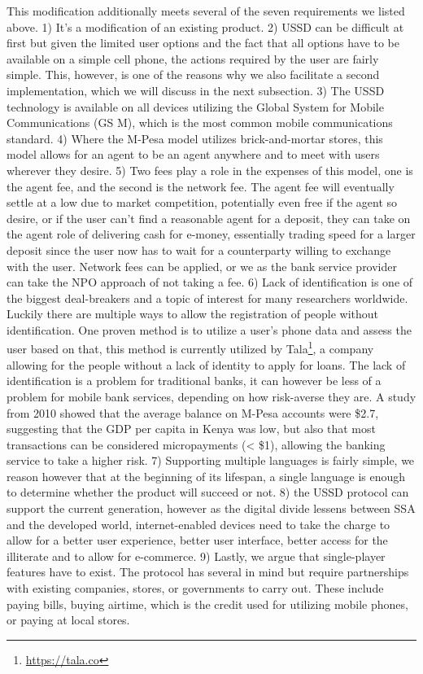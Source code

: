 \documentclass[11pt, a4paper]{article}
\begin{document}
This modification additionally meets several of the seven requirements we listed above.
1) It's a modification of an existing product.
2) USSD can be difficult at first but given the limited user options and the fact that all options have to be available on a simple cell phone, the actions required by the user are fairly simple. This, however, is one of the reasons why we also facilitate a second implementation, which we will discuss in the next subsection.
3) The USSD technology is available on all devices utilizing the Global System for Mobile Communications (GS
M), which is the most common mobile communications standard.
4) Where the M-Pesa model utilizes brick-and-mortar stores, this model allows for an agent to be an agent anywhere and to meet with users wherever they desire.
5) Two fees play a role in the expenses of this model, one is the agent fee, and the second is the network fee. The agent fee will eventually settle at a low due to market competition, potentially even free if the agent so desire, or if the user can't find a reasonable agent for a deposit, they can take on the agent role of delivering cash for e-money, essentially trading speed for a larger deposit since the user now has to wait for a counterparty willing to exchange with the user. Network fees can be applied, or we as the bank service provider can take the NPO approach of not taking a fee.
6) Lack of identification is one of the biggest deal-breakers and a topic of interest for many researchers worldwide. Luckily there are multiple ways to allow the registration of people without identification. One proven method is to utilize a user's phone data and assess the user based on that, this method is currently utilized by Tala\footnote{\url{https://tala.co}}, a company allowing for the people without a lack of identity to apply for loans. The lack of identification is a problem for traditional banks, it can however be less of a problem for mobile bank services, depending on how risk-averse they are. A study from 2010 showed that the average balance on M-Pesa accounts were \$2.7\cite{mpesastats}, suggesting that the GDP per capita in Kenya was low, but also that most transactions can be considered micropayments (< \$1), allowing the banking service to take a higher risk.
7) Supporting multiple languages is fairly simple, we reason however that at the beginning of its lifespan, a single language is enough to determine whether the product will succeed or not.
8) the USSD protocol can support the current generation, however as the digital divide lessens between SSA and the developed world, internet-enabled devices need to take the charge to allow for a better user experience, better user interface, better access for the illiterate and to allow for e-commerce.
9) Lastly, we argue that single-player features have to exist. The protocol has several in mind but require partnerships with existing companies, stores, or governments to carry out. These include paying bills, buying airtime, which is the credit used for utilizing mobile phones, or paying at local stores.
\end{document}
